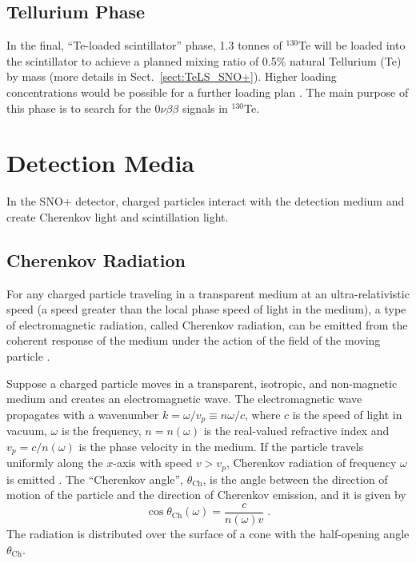 \subsection{Tellurium Phase} \label{sect:tePhase}

In the final, ``Te-loaded scintillator'' phase, 1.3 tonnes of $^{130}$Te will be loaded into the scintillator to achieve a planned mixing ratio of 0.5\% natural Tellurium (Te) by mass (more details in Sect.~\ref{sect:TeLS_SNO+}). Higher loading concentrations would be possible for a further loading plan \cite{Paton:2019kgy}. The main purpose of this phase is to search for the $0\nu\beta\beta$ signals in $^{130}$Te.

\section{Detection Media} \label{sect:detectionMedia}

In the SNO+ detector, charged particles interact with the detection medium and create Cherenkov light and scintillation light. 

\subsection{Cherenkov Radiation}\label{sect:cherenkov}

For any charged particle traveling in a transparent medium at an ultra-relativistic speed (a speed greater than the local phase speed of light in the medium), a type of electromagnetic radiation, called Cherenkov radiation, can be emitted from the coherent response of the medium under the action of the field of the moving particle \cite{jackson2007classical,landau2013electrodynamics}.

Suppose a charged particle moves in a transparent, isotropic, and non-magnetic medium and creates an electromagnetic wave. The electromagnetic wave propagates with a wavenumber $k=\omega/v_p \equiv n\omega/c$, where $c$ is the speed of light in vacuum, $\omega$ is the frequency, $n=n(\omega)$ is the real-valued refractive index and $v_p=c/n(\omega)$ is the phase velocity in the medium. If the particle travels uniformly along the $x$-axis with speed $v>v_p$, Cherenkov radiation of frequency $\omega$ is emitted \cite{landau2013electrodynamics}. The ``Cherenkov angle'', $\theta_\mathrm{Ch}$, is the angle between the direction of motion of the particle and the direction of Cherenkov emission, and it is given by 
\begin{equation}
\cos\theta_\mathrm{Ch}(\omega) = \frac{c}{n(\omega)v} \; .
\end{equation}
The radiation is distributed over the surface of a cone with the half-opening angle $\theta_\mathrm{Ch}$. 


